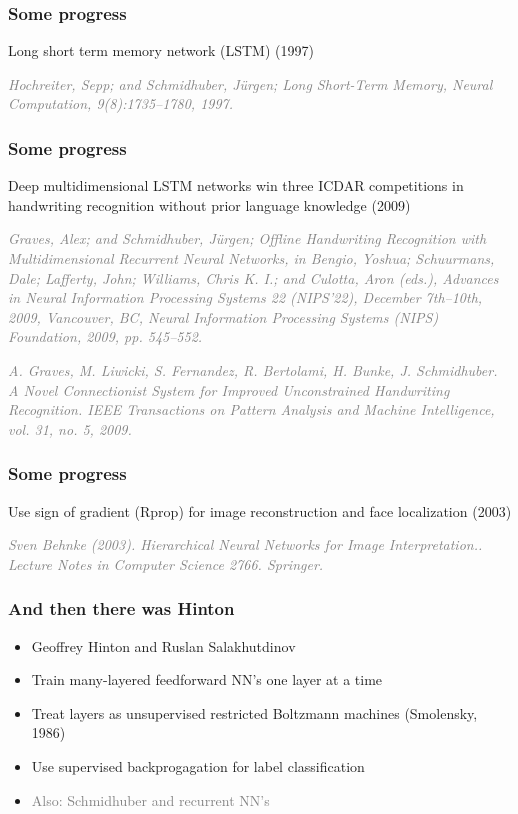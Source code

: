 \documentclass[t]{beamer}
\newcommand\gray[1]{\textcolor{gray}{#1}}
\newcommand\smallgray[1]{\textcolor{gray}{\small\it #1}}
\newcommand\prevwork[1]{\smallgray{#1}}
\begin{document}
\begin{frame}
  \frametitle{Some progress}
    
  Long short term memory network (LSTM) (1997)

  \prevwork{Hochreiter, Sepp; and Schmidhuber, Jürgen; Long
    Short-Term Memory, Neural Computation, 9(8):1735–1780, 1997.}
\end{frame}

\begin{frame}
  \frametitle{Some progress} 

  Deep multidimensional LSTM networks win three ICDAR competitions in
  handwriting recognition without prior language knowledge (2009)

  \prevwork{Graves, Alex; and Schmidhuber, Jürgen; Offline Handwriting
    Recognition with Multidimensional Recurrent Neural Networks, in
    Bengio, Yoshua; Schuurmans, Dale; Lafferty, John; Williams, Chris
    K. I.; and Culotta, Aron (eds.), Advances in Neural Information
    Processing Systems 22 (NIPS'22), December 7th–10th, 2009,
    Vancouver, BC, Neural Information Processing Systems (NIPS)
    Foundation, 2009, pp. 545–552.}

  \prevwork{A. Graves, M. Liwicki, S. Fernandez, R. Bertolami,
    H. Bunke, J. Schmidhuber. A Novel Connectionist System for
    Improved Unconstrained Handwriting Recognition. IEEE Transactions
    on Pattern Analysis and Machine Intelligence, vol. 31, no. 5,
    2009.}
\end{frame}

\begin{frame}
  \frametitle{Some progress}

  Use sign of gradient (Rprop) for image reconstruction and face
  localization (2003)

  \prevwork{Sven Behnke (2003). Hierarchical Neural Networks for Image
    Interpretation.. Lecture Notes in Computer Science
    2766. Springer.}
\end{frame}

\begin{frame}
  \frametitle{And then there was Hinton}
  \begin{itemize}
  \item Geoffrey Hinton and Ruslan Salakhutdinov
  \item Train many-layered feedforward NN's one layer at a time
  \item Treat layers as unsupervised restricted Boltzmann machines
    (Smolensky, 1986)
  \item Use supervised backprogagation for label classification
  \item \gray{Also: Schmidhuber and recurrent NN's}
  \end{itemize}
\end{frame}
\end{document}
